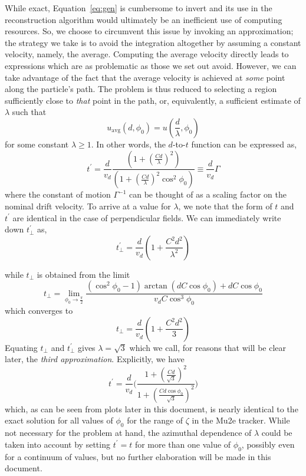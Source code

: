 \documentclass[twoside]{article}
\begin{document}
\begin{multicols}{2}
While exact, Equation~\ref{eq:gen} is cumbersome to invert and its use in the reconstruction algorithm would ultimately be an inefficient use of computing resources. So, we choose to circumvent this issue by invoking an approximation; the strategy we take is to avoid the integration altogether by assuming a constant velocity, namely, the average. Computing the average velocity directly leads to expressions which are as problematic as those we set out avoid. However, we can take advantage of the fact that the average velocity is achieved at \emph{some} point along the particle's path. The problem is thus reduced to selecting a region sufficiently close to \emph{that} point in the path, or, equivalently, a sufficient estimate of $\lambda$ such that  
\begin{equation}
u_{\text{avg}}(d,\phi_0) = u(\frac{d}{\lambda},\phi_0)
\end{equation}
for some constant $\lambda \geq 1$.  In other words, the $d$-to-$t$ function can be expressed as,
\begin{equation}
t^\prime =  \frac{d}{v_d} \frac{ (1 + (\frac{C d}{\lambda})^2)}{(1 + (\frac{C d}{\lambda})^2 \cos^2 \phi_0)} \equiv \frac{d}{v_d} \Gamma
\end{equation}
where the constant of motion $\Gamma^{-1}$ can be thought of as a scaling factor on the nominal drift velocity. To arrive at a value for $\lambda$, we note that the form of $t$ and $t^\prime$ are identical in the case of perpendicular fields. We can immediately write down $t^{\prime}_\perp$ as,
\begin{equation}
t^{\prime}_\perp = \frac{d}{v_d}( 1 + \frac{C^2 d^2}{\lambda^2})
\end{equation}

while $t_\perp$ is obtained from the limit
\begin{equation}
t_{\perp} = \lim_{\phi_0\to \frac{\pi}{2}} \frac{(\cos^2 \phi_0 - 1) \arctan(d C \cos \phi_0 ) + d C \cos \phi_0 }{v_d C \cos^3 \phi_0}
\end{equation}
which converges to
\begin{equation}
t_{\perp} = \frac{d}{v_d}( 1 + \frac{C^2 d^2}{3})
\end{equation}
Equating $t_{\perp}$ and $t^\prime_{\perp}$ gives $\lambda = \sqrt{3}$ which we call, for reasons that will be clear later, the \emph{third approximation}. Explicitly, we have
\begin{equation}
\boxed{
t^\prime = \frac{d}{v_d}\bigg(\frac{1 + (\frac{C d}{\sqrt{3}})^2}{1 + (\frac{C d  \cos \phi_0}{\sqrt{3}})^2}\bigg)
}
\end{equation}
which, as can be seen from plots later in this document, is nearly identical to the exact solution for all values of $\phi_0$ for the range of $\zeta$ in the Mu2e tracker. 
While not necessary for the problem at hand, the azimuthal dependence of $\lambda$ could be taken into account by setting $t^\prime = t$ for more than one value of $\phi_0$, 
possibly even for a continuum of values, but no further elaboration will be made in this document.


\end{multicols}
\end{document}
